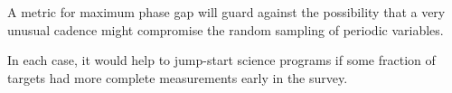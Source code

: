 A metric for maximum phase gap will guard against the possibility that a very unusual cadence might compromise the random sampling of periodic variables.

In each case, it would help to jump-start science programs if some fraction of targets had more complete measurements early in the survey.


\navigationbar
